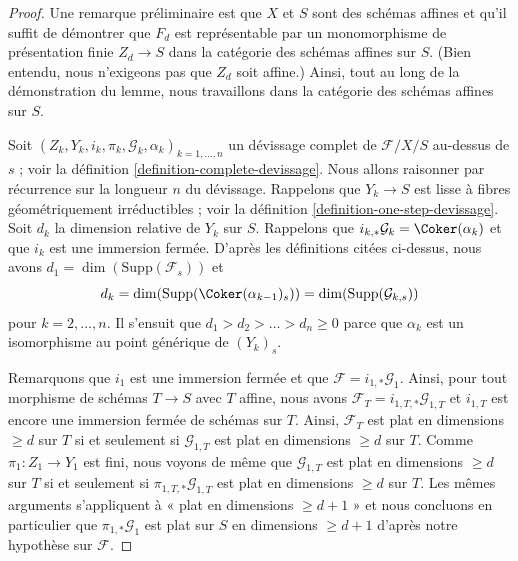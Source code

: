 \begin{proof}
Une remarque préliminaire est que $X$ et $S$ sont des schémas affines et qu'il
suffit de démontrer que $F_d$ est représentable par un monomorphisme de présentation
finie $Z_d \to S$ dans la catégorie des schémas affines sur $S$.
(Bien entendu, nous n'exigeons pas que $Z_d$ soit affine.)
Ainsi, tout au long de la démonstration du
lemme, nous travaillons dans la catégorie des schémas affines sur $S$.

\medskip\noindent
Soit $(Z_k, Y_k, i_k, \pi_k, \mathcal{G}_k, \alpha_k)_{k = 1, \ldots, n}$
un d\'evissage complet de $\mathcal{F}/X/S$ au-dessus de $s$ ; voir la
définition \ref{definition-complete-devissage}.
Nous allons raisonner par récurrence sur la longueur $n$ du d\'evissage.
Rappelons que $Y_k \to S$ est lisse à fibres géométriquement irréductibles ; voir la
définition \ref{definition-one-step-devissage}.
Soit $d_k$ la dimension relative de $Y_k$ sur $S$.
Rappelons que $i_{k, *}\mathcal{G}_k = \Coker(\alpha_k)$ et
que $i_k$ est une immersion fermée.
D'après les définitions citées ci-dessus, nous avons
$d_1 = \dim(\text{Supp}(\mathcal{F}_s))$ et
$$
d_k = \dim(\text{Supp}(\Coker(\alpha_{k - 1})_s))
= \dim(\text{Supp}(\mathcal{G}_{k, s}))
$$
pour $k = 2, \ldots, n$. Il s'ensuit que $d_1 > d_2 > \ldots > d_n \geq 0$
parce que $\alpha_k$ est un isomorphisme au point générique de $(Y_k)_s$.

\medskip\noindent
Remarquons que $i_1$ est une immersion fermée et que
$\mathcal{F} = i_{1, *}\mathcal{G}_1$.
Ainsi, pour tout morphisme de schémas $T \to S$ avec $T$ affine,
nous avons $\mathcal{F}_T = i_{1, T, *}\mathcal{G}_{1, T}$ et
$i_{1, T}$ est encore une immersion fermée de schémas sur $T$.
Ainsi, $\mathcal{F}_T$ est plat en dimensions $\geq d$ sur $T$
si et seulement si $\mathcal{G}_{1, T}$ est plat en dimensions $\geq d$ sur $T$.
Comme $\pi_1 : Z_1 \to Y_1$ est fini, nous voyons de même que
$\mathcal{G}_{1, T}$ est plat en dimensions $\geq d$ sur $T$
si et seulement si $\pi_{1, T, *}\mathcal{G}_{1, T}$ est plat en dimensions
$\geq d$ sur $T$. Les mêmes arguments s'appliquent à
« plat en dimensions $\geq d + 1$ » et nous concluons en particulier que
$\pi_{1, *}\mathcal{G}_1$ est plat sur $S$ en dimensions $\geq d + 1$
d'après notre hypothèse sur $\mathcal{F}$.


\end{proof}
